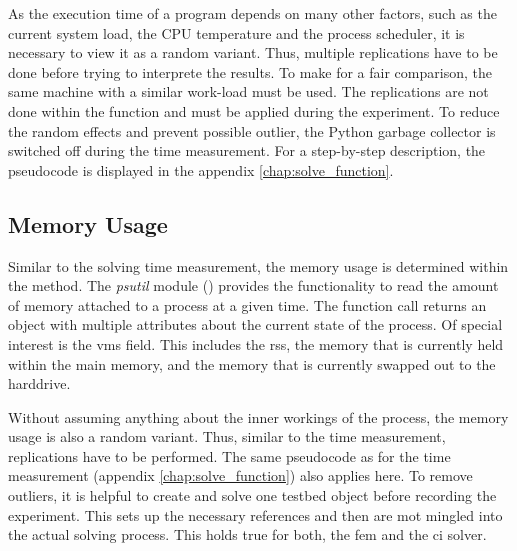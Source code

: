 \documentclass[./\jobname.tex]{subfiles}
\begin{document}
As the execution time of a program depends on many other factors, such as the current system load, the CPU temperature and the process scheduler, it is necessary to view it as a random variant. Thus, multiple replications have to be done before trying to interprete the results. To make for a fair comparison, the same machine with a similar work-load must be used.  The replications are not done within the  function and must be applied during the experiment. To reduce the random effects and prevent possible outlier, the Python garbage collector is switched off during the time measurement. For a step-by-step description, the pseudocode is displayed in the appendix \ref{chap:solve_function}. 



\subsection{Memory Usage}
\label{chap:metric_mem}
Similar to the solving time measurement, the memory usage is determined within the  method. The \textit{psutil} module (\cite{rodola_psutil_2020}) provides the functionality to read the amount of memory attached to a process at a given time. The function call  returns an object with multiple attributes about the current state of the process. Of special interest is the \gls{vms} field. This includes the \gls{rss}, the memory that is currently held within the main memory, and the memory that is currently swapped out to the harddrive.

Without assuming anything about the inner workings of the process, the memory usage is also a random variant. Thus, similar to the time measurement, replications have to be performed. The same pseudocode as for the time measurement (appendix \ref{chap:solve_function}) also applies here. To remove outliers, it is helpful to create and solve one testbed object before recording the experiment. This sets up the necessary references and then are mot mingled into the actual solving process. This holds true for both, the \gls{fem} and the \gls{ci} solver.  
\end{document}
